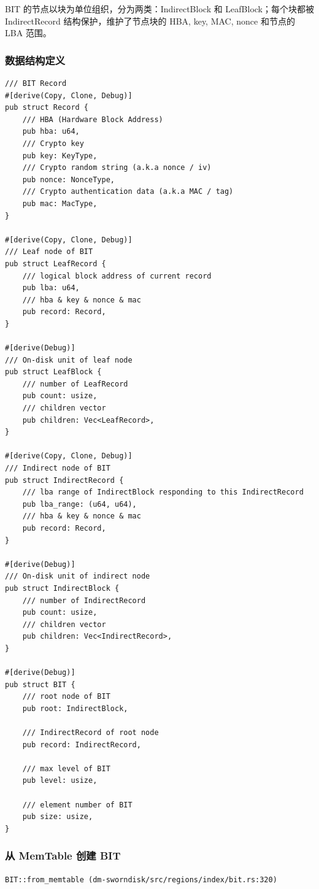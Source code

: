 BIT 的节点以块为单位组织，分为两类：IndirectBlock 和 LeafBlock；每个块都被 IndirectRecord 结构保护，维护了节点块的 HBA, key, MAC, nonce 和节点的 LBA 范围。

\clearpage
\subsubsection{数据结构定义}

\begin{verbatim}
/// BIT Record
#[derive(Copy, Clone, Debug)]
pub struct Record {
    /// HBA (Hardware Block Address)
    pub hba: u64,
    /// Crypto key
    pub key: KeyType,
    /// Crypto random string (a.k.a nonce / iv)
    pub nonce: NonceType,
    /// Crypto authentication data (a.k.a MAC / tag)
    pub mac: MacType,
}

#[derive(Copy, Clone, Debug)]
/// Leaf node of BIT
pub struct LeafRecord {
    /// logical block address of current record
    pub lba: u64,
    /// hba & key & nonce & mac
    pub record: Record,
}

#[derive(Debug)]
/// On-disk unit of leaf node
pub struct LeafBlock {
    /// number of LeafRecord
    pub count: usize,
    /// children vector
    pub children: Vec<LeafRecord>,
}

#[derive(Copy, Clone, Debug)]
/// Indirect node of BIT
pub struct IndirectRecord {
    /// lba range of IndirectBlock responding to this IndirectRecord
    pub lba_range: (u64, u64),
    /// hba & key & nonce & mac
    pub record: Record,
}

#[derive(Debug)]
/// On-disk unit of indirect node
pub struct IndirectBlock {
    /// number of IndirectRecord
    pub count: usize,
    /// children vector
    pub children: Vec<IndirectRecord>,
}

#[derive(Debug)]
pub struct BIT {
    /// root node of BIT
    pub root: IndirectBlock,

    /// IndirectRecord of root node
    pub record: IndirectRecord,

    /// max level of BIT
    pub level: usize,

    /// element number of BIT
    pub size: usize,
}
\end{verbatim}

\subsubsection{从 MemTable 创建 BIT}

\texttt{BIT::from_memtable (dm-sworndisk/src/regions/index/bit.rs:320)}

